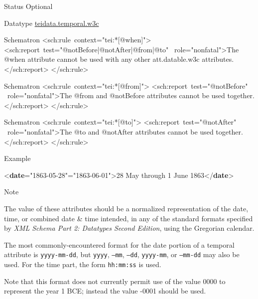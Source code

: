 \begin{reflist}
\begin{sansreflist}
\begin{reflist}
    \item[{Status}]
  Optional
    \item[{Datatype}]
  \hyperref[TEI.teidata.temporal.w3c]{teidata.temporal.w3c}
\end{reflist}  
\end{sansreflist}  
    \item[{Schematron}]
   <sch:rule context="tei:*[@when]"> <sch:report test="@notBefore|@notAfter|@from|@to"  role="nonfatal">The @when attribute cannot be used with any other att.datable.w3c attributes.</sch:report> </sch:rule>
    \item[{Schematron}]
   <sch:rule context="tei:*[@from]"> <sch:report test="@notBefore"  role="nonfatal">The @from and @notBefore attributes cannot be used together.</sch:report> </sch:rule>
    \item[{Schematron}]
   <sch:rule context="tei:*[@to]"> <sch:report test="@notAfter"  role="nonfatal">The @to and @notAfter attributes cannot be used together.</sch:report> </sch:rule>
    \item[{Example}]
  \leavevmode\bgroup{}\exampleFont \begin{shaded}\noindent\mbox{}{<\textbf{date}\hspace*{1em}{from}="{1863-05-28}"\hspace*{1em}{to}="{1863-06-01}">}28 May through 1 June 1863{</\textbf{date}>}\end{shaded}\egroup 


    \item[{Note}]
  \par
The value of these attributes should be a normalized representation of the date, time, or combined date \& time intended, in any of the standard formats specified by \textit{XML Schema Part 2: Datatypes Second Edition}, using the Gregorian calendar.\par
The most commonly-encountered format for the date portion of a temporal attribute is \texttt{yyyy-mm-dd}, but \texttt{yyyy}, \texttt{--mm}, \texttt{---dd}, \texttt{yyyy-mm}, or \texttt{--mm-dd} may also be used. For the time part, the form \texttt{hh:mm:ss} is used.\par
Note that this format does not currently permit use of the value 0000 to represent the year 1 BCE; instead the value -0001 should be used.
\end{reflist}  
